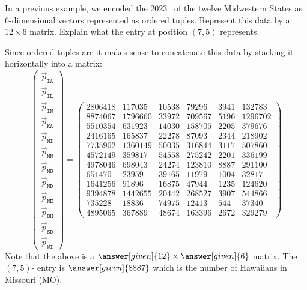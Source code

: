 \documentclass{ximera}
\begin{document}
\begin{example} %
  In a previous example, we encoded the $2023$
  ~of
  the twelve Midwestern States as $6$-dimensional vectors represented
  as ordered tuples. Represent this data by a $12\times 6$
  matrix. Explain what the entry at position $(7,5)$ represents.
  \begin{explanation}
  Since ordered-tuples are  it makes sense to
  concatenate this data by stacking it horizontally into a matrix:
  \[
  \begin{pmatrix}
  \vec{p}_{\texttt{IA}} \\
  \vec{p}_{\texttt{IL}} \\
  \vec{p}_{\texttt{IN}} \\
  \vec{p}_{\texttt{KA}} \\
  \vec{p}_{\texttt{MI}} \\
  \vec{p}_{\texttt{MN}} \\
  \vec{p}_{\texttt{MO}} \\
  \vec{p}_{\texttt{ND}} \\
  \vec{p}_{\texttt{NE}} \\
  \vec{p}_{\texttt{OH}} \\
  \vec{p}_{\texttt{SD}} \\
  \vec{p}_{\texttt{WI}}
  \end{pmatrix}
  =
  \begin{pmatrix}
  2806418 & 117035 & 10538 & 79296 & 3941 & 132783\\
  8874067 & 1796660 & 33972 & 709567 & 5196 & 1296702\\
  5510354 & 631923 & 14030 & 158705 & 2205 & 379676\\
  2416165 & 165837 & 22278 & 87093 & 2344 & 218902\\
  7735902 & 1360149 & 50035 & 316844 & 3117 & 507860\\
  4572149 & 359817 & 54558 & 275242 & 2201 & 336199\\
  4978046 & 698043 & 24274 & 123810 & 8887 & 291100\\
  651470 & 23959 & 39165 & 11979 & 1004 & 32817\\
  1641256 & 91896 & 16875 & 47944 & 1235 & 124620\\
  9394878 & 1442655 & 20442 & 268527 & 3907 & 544866\\
  735228 & 18836 & 74975 & 12413 & 544 & 37340\\
  4895065 & 367889 & 48674 & 163396 & 2672 & 329279
  \end{pmatrix}
  \]
  Note that the above is a $\answer[given]{12}\times \answer[given]{6}$ matrix. The $(7, 5)$- entry is
  $\answer[given]{8887}$ which is the number of Hawaiians in Missouri (MO).
  \end{explanation}
\end{example}
\end{document}
